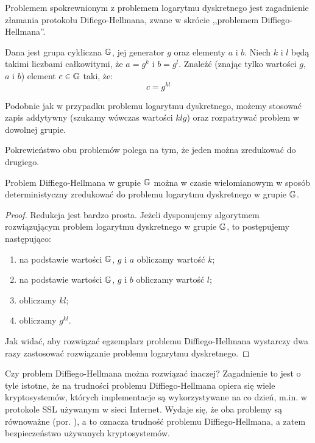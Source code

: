 \noindent
Problemem spokrewnionym z problemem logarytmu dyskretnego
jest zagadnienie złamania protokołu Difiego-Hellmana,
zwane w skrócie ,,problemem Diffiego-Hellmana''.

\begin{problem}
Dana jest grupa cykliczna $\mathbb{G}$,
jej generator $g$
oraz elementy $a$ i $b$.
Niech $k$ i $l$ będą takimi liczbami całkowitymi,
że $a = g^k$ i $b = g^l$.
Znaleźć (znając tylko wartości $g$, $a$ i $b$)
element $c \in \mathbb{G}$ taki, że:
\begin{equation}
c = g^{kl}
\end{equation}
\end{problem}

\begin{remark}
Podobnie jak w przypadku problemu logarytmu dyskretnego,
możemy stosować zapis addytywny (szukamy wówczas wartości $klg$)
oraz rozpatrywać problem w dowolnej grupie.
\end{remark}

\noindent
Pokrewieństwo obu problemów polega na tym,
że jeden można zredukować do drugiego.

\begin{theorem}
Problem Diffiego-Hellmana w grupie $\mathbb{G}$ można
w czasie wielomianowym w sposób deterministyczny
zredukować do problemu logarytmu dyskretnego w grupie $\mathbb{G}$.
\end{theorem}

\begin{proof}
Redukcja jest bardzo prosta.
Jeżeli dysponujemy algorytmem rozwiązującym
problem logarytmu dyskretnego w grupie $\mathbb{G}$,
to postępujemy następująco:
\begin{enumerate}
\item na podstawie wartości $\mathbb{G}$, $g$ i $a$ obliczamy wartość $k$;
\item na podstawie wartości $\mathbb{G}$, $g$ i $b$ obliczamy wartość $l$;
\item obliczamy $kl$;
\item obliczamy $g^{kl}$.
\end{enumerate}
Jak widać, aby rozwiązać egzemplarz problemu Diffiego-Hellmana
wystarczy dwa razy zastosować rozwiązanie problemu logarytmu dyskretnego.
\end{proof}

\noindent
Czy problem Diffiego-Hellmana można rozwiązać inaczej?
Zagadnienie to jest o tyle istotne,
że na trudności problemu Diffiego-Hellmana
opiera się wiele kryptosystemów,
których implementacje są wykorzystywane na co dzień,
m.in. w protokole SSL używanym w sieci Internet.
Wydaje się, że oba problemy są równoważne (por. \cite{maurer}),
a to oznacza trudność problemu Diffiego-Hellmana,
a zatem bezpieczeństwo używanych kryptosystemów.

